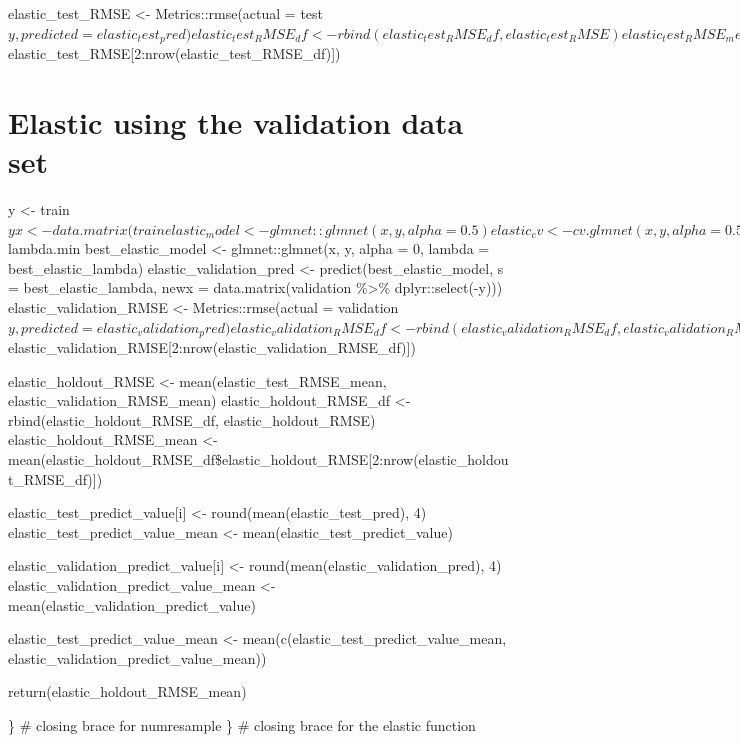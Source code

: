 \documentclass[
]{book}
\begin{document}
elastic\_test\_RMSE \textless- Metrics::rmse(actual =
test\(y, predicted = elastic_test_pred)
elastic_test_RMSE_df <- rbind(elastic_test_RMSE_df, elastic_test_RMSE)
elastic_test_RMSE_mean <- mean(elastic_test_RMSE_df\)elastic\_test\_RMSE{[}2:nrow(elastic\_test\_RMSE\_df){]})

\section{Elastic using the validation data set}\label{elastic-using-the-validation-data-set}

y \textless- train\(y
x <- data.matrix(train %
elastic_model <- glmnet::glmnet(x, y, alpha = 0.5)
elastic_cv <- cv.glmnet(x, y, alpha = 0.5)
best_elastic_lambda <- elastic_cv\)lambda.min best\_elastic\_model \textless-
glmnet::glmnet(x, y, alpha = 0, lambda = best\_elastic\_lambda)
elastic\_validation\_pred \textless- predict(best\_elastic\_model, s =
best\_elastic\_lambda, newx = data.matrix(validation \%\textgreater\%
dplyr::select(-y))) elastic\_validation\_RMSE \textless- Metrics::rmse(actual =
validation\(y, predicted = elastic_validation_pred)
elastic_validation_RMSE_df <- rbind(elastic_validation_RMSE_df, elastic_validation_RMSE)
elastic_validation_RMSE_mean <- mean(elastic_validation_RMSE_df\)elastic\_validation\_RMSE{[}2:nrow(elastic\_validation\_RMSE\_df){]})

elastic\_holdout\_RMSE \textless- mean(elastic\_test\_RMSE\_mean,
elastic\_validation\_RMSE\_mean) elastic\_holdout\_RMSE\_df \textless-
rbind(elastic\_holdout\_RMSE\_df, elastic\_holdout\_RMSE)
elastic\_holdout\_RMSE\_mean \textless-
mean(elastic\_holdout\_RMSE\_df\$elastic\_holdout\_RMSE{[}2:nrow(elastic\_holdout\_RMSE\_df){]})

elastic\_test\_predict\_value{[}i{]} \textless- round(mean(elastic\_test\_pred), 4)
elastic\_test\_predict\_value\_mean \textless- mean(elastic\_test\_predict\_value)

elastic\_validation\_predict\_value{[}i{]} \textless-
round(mean(elastic\_validation\_pred), 4)
elastic\_validation\_predict\_value\_mean \textless-
mean(elastic\_validation\_predict\_value)

elastic\_test\_predict\_value\_mean \textless-
mean(c(elastic\_test\_predict\_value\_mean,
elastic\_validation\_predict\_value\_mean))

return(elastic\_holdout\_RMSE\_mean)

\} \# closing brace for numresample \} \# closing brace for the elastic
function
\end{document}
